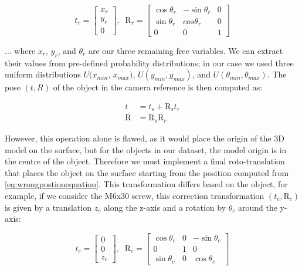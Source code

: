 \begin{equation*}
    t_r = 
    \begin{bmatrix}
        x_r\\y_r\\0
    \end{bmatrix}
    ,\; \; \text{R}_r =
    \begin{bmatrix}
        \cos \theta_r & - \sin \theta_r & 0 \\
        \sin \theta_r & cos \theta_r & 0 \\
        0 & 0 & 1
    \end{bmatrix}
\end{equation*}

... where $x_r$, $y_r$, and  $\theta_r$ are our three remaining free variables. We can extract their values from pre-defined probability distributions; in our case we used three uniform distributions $U(x_{min}$, $x_{max})$, $U(y_{min}, y_{max})$, and $U(\theta_{min}, \theta_{max})$. The pose $(t, R)$ of the object in the camera reference is then computed as:

\begin{align}
    t &= t_s + \text{R}_s t_r \label{eq:wrongpostionequation} \\
    \text{R} &= \text{R}_s \text{R}_r \nonumber
\end{align}

However, this operation alone is flawed, as it would place the origin of the 3D model on the surface, but for the objects in our dataset, the model origin is in the centre of the object. Therefore we must implement a final roto-translation that places the object on the surface starting from the position computed from \ref*{eq:wrongpostionequation}. This transformation differs based on the object, for example, if we consider the M6x30 screw, this correction transformation $(t_c, \text{R}_c)$ is given by a translation $z_c$ along the z-axis and a rotation by $\theta_c$ around the y-axis:

\begin{equation*}
    t_c = 
    \begin{bmatrix}
        0\\0\\z_c
    \end{bmatrix}
    ,\; \; \text{R}_c =
    \begin{bmatrix}
        \cos \theta_c & 0 & -\sin \theta_c\\
        0 & 1 & 0\\
        \sin \theta_c & 0 &  \cos \theta_c
    \end{bmatrix}
\end{equation*}

